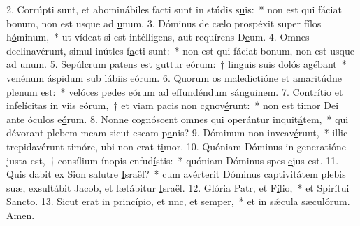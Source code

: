 2. Corrúpti sunt, et abominábiles facti sunt in stúdis s\uline{u}is:~* non est qui fáciat bonum, non est usque ad \uline{u}num.
3. Dóminus de cælo prospéxit super fílos h\uline{ó}minum,~* ut vídeat si est intélligens, aut requírens D\uline{e}um.
4. Omnes declinavérunt, simul inútles f\uline{a}cti sunt:~* non est qui fáciat bonum, non est usque ad \uline{u}num.
5. Sepúlcrum patens est guttur eórum:~† linguis suis dolós ag\uline{é}bant~* venénum áspidum sub lábiis e\uline{ó}rum.
6. Quorum os maledictióne et amaritúdne pl\uline{e}num est:~* velóces pedes eórum ad effundéndum s\uline{á}nguinem.
7. Contrítio et infelícitas in viis eórum,~† et viam pacis non cgnov\uline{é}runt:~* non est timor Dei ante óculos e\uline{ó}rum.
8. Nonne cognóscent omnes qui operántur inquit\uline{á}tem,~* qui dévorant plebem meam sicut escam p\uline{a}nis?
9. Dóminum non invcav\uline{é}runt,~* illic trepidavérunt timóre, ubi non erat t\uline{i}mor.
10. Quóniam Dóminus in generatióne justa est,~† consílium ínopis cnfud\uline{í}stis:~* quóniam Dóminus spes \uline{e}jus est.
11. Quis dabit ex Sion salutre \uline{I}sraël?~* cum avérterit Dóminus captivitátem plebis suæ, exsultábit Jacob, et lætábitur \uline{I}sraël.
12. Glória Patr, et F\uline{í}lio,~* et Spirítui S\uline{a}ncto.
13. Sicut erat in princípio, et nnc, et s\uline{e}mper,~* et in sǽcula sæculórum. \uline{A}men.
